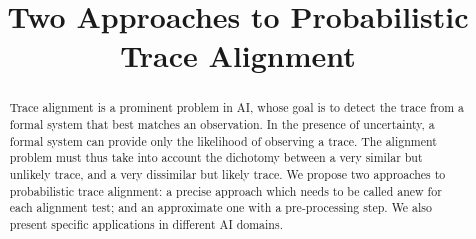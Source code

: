 \documentclass{article}
\title{Two Approaches to Probabilistic Trace Alignment}
\date{\vspace{-5em}}
\begin{document}
\maketitle

\begin{abstract}
Trace alignment is a prominent problem in AI, whose goal is to detect the trace from a formal 
system that best matches an observation. In the presence of uncertainty, a
formal system can provide only the likelihood of observing a trace. The alignment problem must thus take into account 
the dichotomy between a very similar but unlikely trace, and a very
dissimilar but likely trace. We propose two approaches to probabilistic trace alignment: a precise approach which
needs to be called anew for each alignment test; and an approximate one with a pre-processing step. We also present
specific applications in different AI domains.
\end{abstract}











\clearpage



\newpage

\end{document}
